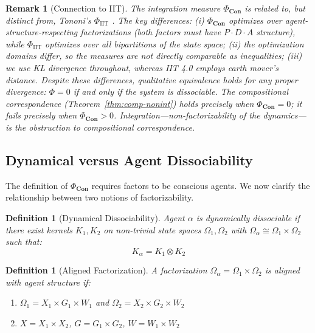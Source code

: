 \documentclass[11pt,a4paper]{article}
\newtheorem{definition}[theorem]{Definition}
\newtheorem*{remark}{Remark}
\newcommand{\Con}{\mathbf{Con}}
\begin{document}
\begin{remark}[Connection to IIT]
The integration measure $\Phi_{\Con}$ is related to, but distinct from, Tononi's $\Phi_{\text{IIT}}$ \cite{tononi2015}. The key differences: (i) $\Phi_{\Con}$ optimizes over agent-structure-respecting factorizations (both factors must have $P \cdot D \cdot A$ structure), while $\Phi_{\text{IIT}}$ optimizes over all bipartitions of the state space; (ii) the optimization domains differ, so the measures are not directly comparable as inequalities; (iii) we use KL divergence throughout, whereas IIT 4.0 employs earth mover's distance. Despite these differences, qualitative equivalence holds for any proper divergence: $\Phi = 0$ if and only if the system is dissociable. The compositional correspondence (Theorem~\ref{thm:comp-nonint}) holds precisely when $\Phi_{\Con} = 0$; it fails precisely when $\Phi_{\Con} > 0$. Integration---non-factorizability of the dynamics---is the obstruction to compositional correspondence.
\end{remark}

\subsection{Dynamical versus Agent Dissociability}

The definition of $\Phi_{\Con}$ requires factors to be conscious agents. We now clarify the relationship between two notions of factorizability.

\begin{definition}[Dynamical Dissociability]\label{def:dyn-dissoc}
Agent $\alpha$ is \emph{dynamically dissociable} if there exist kernels $K_1, K_2$ on non-trivial state spaces $\Omega_1, \Omega_2$ with $\Omega_\alpha \cong \Omega_1 \times \Omega_2$ such that:
\[
K_\alpha = K_1 \otimes K_2
\]
\end{definition}

\begin{definition}[Aligned Factorization]\label{def:aligned}
A factorization $\Omega_\alpha = \Omega_1 \times \Omega_2$ is \emph{aligned} with agent structure if:
\begin{enumerate}[nosep]
    \item $\Omega_1 = X_1 \times G_1 \times W_1$ and $\Omega_2 = X_2 \times G_2 \times W_2$
    \item $X = X_1 \times X_2$, $G = G_1 \times G_2$, $W = W_1 \times W_2$
\end{enumerate}
\end{definition}
\end{document}
